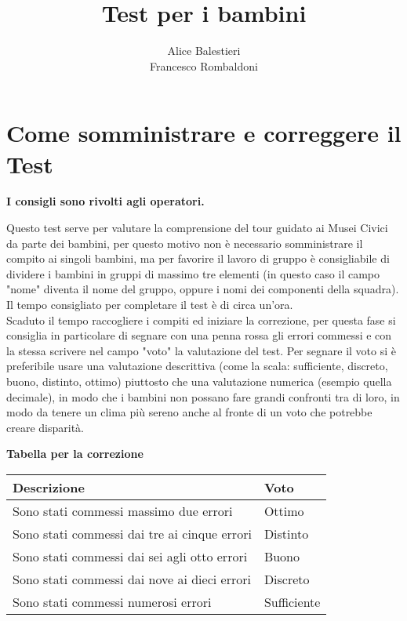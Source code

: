 \documentclass[hidelinks,12pt,a4paper]{exam}
\begin{document}
	
	\title{\textbf{Test per i bambini}}
	\author{Alice Balestieri\\Francesco Rombaldoni}
	\date{}
	\maketitle
	
	\newpage
	
	\tableofcontents
	\newpage
	
	\section{Come somministrare e correggere il Test}
	\begin{center}
		\textbf{I consigli sono rivolti agli operatori.}
	\end{center}
	
	Questo test serve per valutare la comprensione del tour guidato ai Musei Civici da parte dei bambini, per questo motivo non è necessario somministrare il compito ai singoli bambini, ma per favorire il lavoro di gruppo è consigliabile di dividere i bambini in gruppi di massimo tre elementi (in questo caso il campo "nome" diventa il nome del gruppo, oppure i nomi dei componenti della squadra). Il tempo consigliato per completare il test è di circa un'ora.\\
	Scaduto il tempo raccogliere i compiti ed iniziare la correzione, per questa fase si consiglia in particolare di segnare con una penna rossa gli errori commessi e con la stessa scrivere nel campo "voto" la valutazione del test. Per segnare il voto si è preferibile usare una valutazione descrittiva (come la scala: sufficiente, discreto, buono, distinto, ottimo) piuttosto che una valutazione numerica (esempio quella decimale), in modo che i bambini non possano fare grandi confronti tra di loro, in modo da tenere un clima più sereno anche al fronte di un voto che potrebbe creare disparità.\\
	
	\begin{center}
		\large{\textbf{Tabella per la correzione}}\\
		\bigskip
		
		\begin{tabularx}{0.5\textwidth} { 
				| >{\raggedright\arraybackslash}X 
				| >{\centering\arraybackslash}X | }
			\hline
			\textbf{Descrizione} & \textbf{Voto} \\
			\hline
			Sono stati commessi massimo due errori & Ottimo\\
			\hline
			Sono stati commessi dai tre ai cinque errori & Distinto\\
			\hline
			Sono stati commessi dai sei agli otto errori & Buono\\
			\hline
			Sono stati commessi dai nove ai dieci errori & Discreto\\
			\hline
			Sono stati commessi numerosi errori & Sufficiente\\
			\hline
		\end{tabularx}
	\end{center}
	
\end{document}
